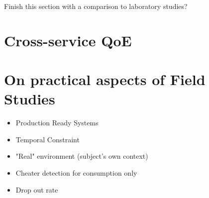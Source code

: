 
Finish this section with a comparison to laboratory studies?


\section{Cross-service QoE}

\section{On practical aspects of Field Studies}
\begin{itemize}
\item Production Ready Systems
\item Temporal Constraint
\item "Real" environment (subject's own context)
\item Cheater detection for consumption only
\item Drop out rate
\end{itemize}